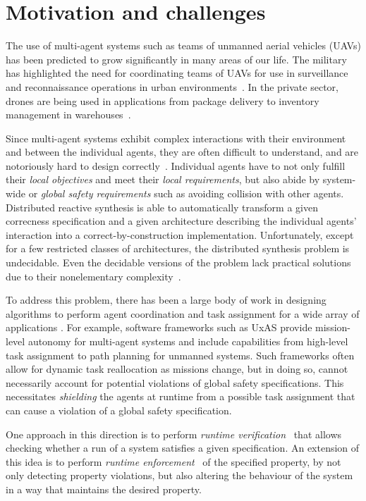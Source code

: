 \section{Motivation and challenges}

The use of multi-agent systems such as teams of unmanned aerial vehicles (UAVs) has been predicted to grow significantly in many areas of our life. The military has highlighted the need for coordinating teams of UAVs for use in surveillance and reconnaissance operations in urban environments~\cite{semsch2009autonomous,samad2007network}. In the private sector, drones are being used in applications from package delivery to inventory management in warehouses~\cite{ong2007multi}. 

Since multi-agent systems exhibit complex interactions with their environment and between the individual agents, they are often difficult to understand, and are notoriously hard to design correctly~\cite{Netflix}. Individual agents have to not only fulfill their \emph{local objectives} and meet their \emph{local requirements}, but also abide by system-wide or \emph{global safety requirements} such as avoiding collision with other agents.  Distributed reactive synthesis is able to automatically transform a given correcness specification and a given architecture describing the individual agents' interaction into a correct-by-construction implementation. Unfortunately, except for a few restricted classes of architectures, the distributed synthesis problem is undecidable. Even the decidable versions of the problem lack practical solutions due to their nonelementary complexity~\cite{Schewe08}.  
 
To address this problem, there has been a large body of work in designing algorithms to perform agent coordination and task assignment for a wide array of  applications \cite{bertuccelli2009real,sujit2005multi}. For example, software frameworks such as UxAS \cite{rasmussen2018brief} provide mission-level autonomy for multi-agent systems and include capabilities from high-level task assignment to path planning for unmanned systems. Such frameworks often allow for dynamic task reallocation as missions change, but in doing so, cannot necessarily account for potential violations of global safety specifications. This necessitates \emph{shielding} the agents at runtime from a possible task assignment that can cause a violation of a global safety specification.

One approach in this direction is to perform \emph{runtime verification}~\cite{BauerLS11} that allows checking whether a run of a system
satisfies a given specification.  An extension of this idea is to perform \emph{runtime enforcement}~\cite{Schneider00, Falcone10} of the specified property, by not only detecting property violations, but also altering the behaviour of the system in a way that maintains the desired property.



